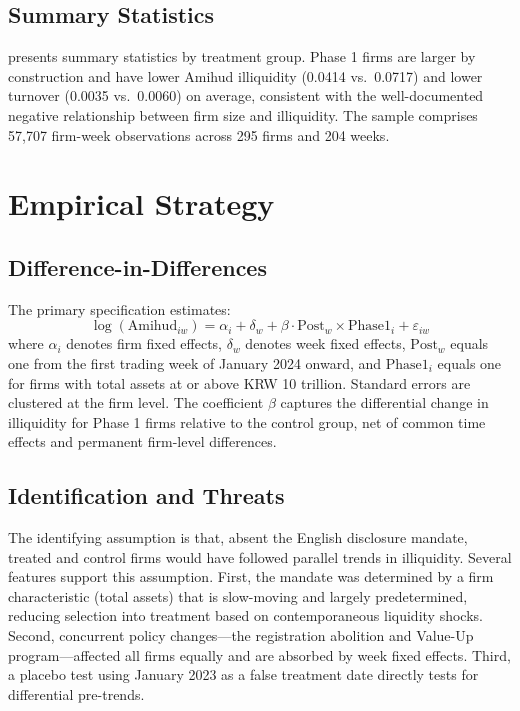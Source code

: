 \documentclass[12pt]{article}
\begin{document}
\subsection{Summary Statistics}



 presents summary statistics by treatment group. Phase 1 firms are larger by construction and have lower Amihud illiquidity (0.0414 vs.\ 0.0717) and lower turnover (0.0035 vs.\ 0.0060) on average, consistent with the well-documented negative relationship between firm size and illiquidity. The sample comprises 57,707 firm-week observations across 295 firms and 204 weeks.


\section{Empirical Strategy}

\subsection{Difference-in-Differences}

The primary specification estimates:
\begin{equation}
\log(\text{Amihud}_{iw}) = \alpha_i + \delta_w + \beta \cdot \text{Post}_w \times \text{Phase1}_i + \varepsilon_{iw}
\label{eq:did}
\end{equation}
where $\alpha_i$ denotes firm fixed effects, $\delta_w$ denotes week fixed effects, $\text{Post}_w$ equals one from the first trading week of January 2024 onward, and $\text{Phase1}_i$ equals one for firms with total assets at or above KRW 10 trillion. Standard errors are clustered at the firm level. The coefficient $\beta$ captures the differential change in illiquidity for Phase 1 firms relative to the control group, net of common time effects and permanent firm-level differences.

\subsection{Identification and Threats}

The identifying assumption is that, absent the English disclosure mandate, treated and control firms would have followed parallel trends in illiquidity. Several features support this assumption. First, the mandate was determined by a firm characteristic (total assets) that is slow-moving and largely predetermined, reducing selection into treatment based on contemporaneous liquidity shocks. Second, concurrent policy changes---the registration abolition and Value-Up program---affected all firms equally and are absorbed by week fixed effects. Third, a placebo test using January 2023 as a false treatment date directly tests for differential pre-trends.
\end{document}
